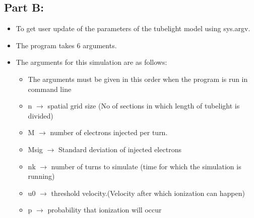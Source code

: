 \documentclass[10pt,notitlepage,onecolumn,aps,pra]{revtex4-1}
\providecommand{\tightlist}{%
      \setlength{\itemsep}{0pt}\setlength{\parskip}{0pt}}
\begin{document}
    \subsection{Part B:}\label{part-b}

\begin{itemize}
\tightlist
\item
  To get user update of the parameters of the tubelight model using
  sys.argv.
\item
  The program takes 6 arguments.
\item
  The arguments for this simulation are as follows:

  \begin{itemize}
  \tightlist
  \item
    The arguments must be given in this order when the program is run in
    command line
  \item
    n \(\to\) spatial grid size (No of sections in which length of
    tubelight is divided)
  \item
    M \(\to\) number of electrons injected per turn.
  \item
    Msig \(\to\) Standard deviation of injected electrons
  \item
    nk \(\to\) number of turns to simulate (time for which the
    simulation is running)
  \item
    u0 \(\to\) threshold velocity.(Velocity after which ionization can
    happen)
  \item
    p \(\to\) probability that ionization will occur
  \end{itemize}
\end{itemize}
\end{document}
